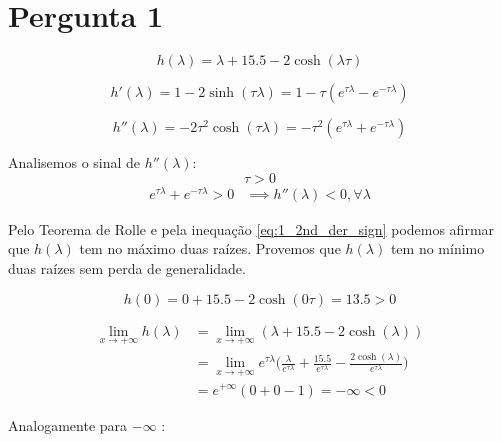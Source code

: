 \documentclass[a4paper, 12pt]{article}
\begin{document}


\section{Pergunta 1}
	\begin{equation} \label{init}
		h(\lambda) = \lambda + 15.5 - 2\cosh(\lambda\tau)
	\end{equation}

	\begin{equation}
		h'(\lambda) = 1 - 2\sinh(\tau\lambda) = 1 - \tau(e^{\tau\lambda} - e^{-\tau\lambda})
	\end{equation}

	\begin{equation}
		h''(\lambda) = -2\tau^2\cosh(\tau\lambda) = -\tau^2(e^{\tau\lambda} + e^{-\tau\lambda})
	\end{equation}

	\par
	Analisemos o sinal de $h''(\lambda)$:
	$$\tau > 0$$
	\begin{equation} \label{eq:1_2nd_der_sign}
	\begin{split}
		e^{\tau\lambda} + e^{-\tau\lambda} > 0 &\implies h''(\lambda) < 0, \forall \lambda
	\end{split}
	\end{equation}

	\par
	Pelo Teorema de Rolle e pela inequação \eqref{eq:1_2nd_der_sign} podemos afirmar que
	$h(\lambda)$ tem no máximo duas raízes. Provemos que $h(\lambda)$ tem no mínimo duas raízes sem perda de generalidade.

	\begin{equation}
		h(0) = 0 + 15.5 - 2\cosh(0\tau) = 13.5 > 0
	\end{equation}

	\begin{equation}
	\begin{split}
		\lim_{x \to +\infty} h(\lambda)
		&= \lim_{x \to +\infty} (\lambda + 15.5 - 2\cosh(\lambda)) \\
		&= \lim_{x \to +\infty} e^{\tau\lambda} \bigg(\frac{\lambda}{e^{\tau\lambda}} + \frac{15.5}{e^{\tau\lambda}} - \frac{2\cosh(\lambda)}{e^{\tau\lambda}}\bigg) \\
		&= e^{+\infty} (0 + 0 - 1) = -\infty < 0
	\end{split}
	\end{equation}

	\par
	Analogamente para  $-\infty$ :
\end{document}

